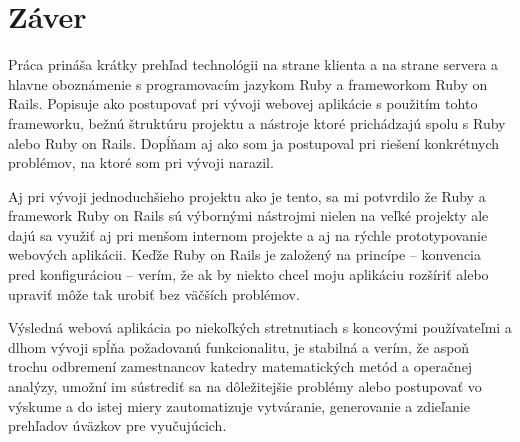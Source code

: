 \chapter*{Záver}

Práca prináša krátky prehľad technológii na strane klienta a na strane servera a hlavne oboznámenie s programovacím jazykom Ruby a frameworkom Ruby on Rails. Popisuje ako postupovať pri vývoji webovej aplikácie s použitím tohto frameworku, bežnú štruktúru projektu a nástroje ktoré prichádzajú spolu s Ruby alebo Ruby on Rails. Dopĺňam aj ako som ja postupoval pri riešení konkrétnych problémov, na ktoré som pri vývoji narazil.

Aj pri vývoji jednoduchšieho projektu ako je tento, sa mi potvrdilo že Ruby a framework Ruby on Rails sú výbornými nástrojmi nielen na veľké projekty ale dajú sa využiť aj pri menšom internom projekte a aj na rýchle prototypovanie webových aplikácii. Keďže Ruby on Rails je založený na princípe -- konvencia pred konfiguráciou -- verím, že ak by niekto chcel moju aplikáciu rozšíriť alebo upraviť môže tak urobiť bez väčších problémov.

Výsledná webová aplikácia po niekoľkých stretnutiach s koncovými používateľmi a dlhom vývoji spĺňa požadovanú funkcionalitu, je stabilná a verím, že aspoň trochu odbremení zamestnancov katedry matematických metód a operačnej analýzy, umožní im sústrediť sa na dôležitejšie problémy alebo postupovať vo výskume a do istej miery zautomatizuje vytváranie, generovanie a zdieľanie prehľadov úväzkov pre vyučujúcich.